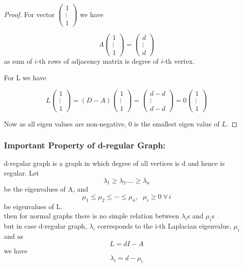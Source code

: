 \documentclass[oneside]{book}
\begin{document}
\begin{proof}
	For vector  $\begin{pmatrix}	1 \\   \vdots \\1 
	\end{pmatrix}$
	we have
	
	$$A  \begin{pmatrix}	1 \\   \vdots \\1 
	\end{pmatrix} =  \begin{pmatrix}	d \\   \vdots \\d
\end{pmatrix}$$
	as sum of  $i$-th rows of adjacency matrix is degree of $i$-th vertex. 
 
	For L we have
	
\[  L \begin{pmatrix}	1 \\   \vdots \\1 
\end{pmatrix} = (D - A) \begin{pmatrix}	1 \\   \vdots \\1 
\end{pmatrix} =  \begin{pmatrix}	d - d \\   \vdots \\d - d 
\end{pmatrix} = 0  \begin{pmatrix}	1 \\   \vdots \\1 
\end{pmatrix}\]
	
	
	Now as all eigen values are non-negative, 0 is the smallest eigen value of $L$.
	
	
	
	
\end{proof}





\hfill \break
\hfill \break

\subsubsection{Important Property of d-regular Graph:}
 d-regular graph is a graph in which degree of all vertices is d and hence is regular.
	Let  $$\lambda_{1} \geq \lambda_{2}....\geq \lambda_{n}$$  be the eigenvalues of A,
	and $$\mu_{1} \leq \mu_{2} \leq \cdots \leq \mu_{n}, \hspace{7pt} \mu_{i} \geq 0 \hspace{3pt} \forall   \hspace{2pt} i$$ be  eigenvalues of L.\\
	 then for normal graphs there is no simple relation between \(\lambda_{i}\)s and \(\mu_{i} \)s \\but in case d-regular
	  graph, $\lambda_{i}$ corresponds to the i-th Laplacian eigenvalue, $\mu_{i}$ and
	as $$L = dI - A$$
	we have $$\lambda_{i} = d - \mu_{i}$$ 
  
\end{document}
